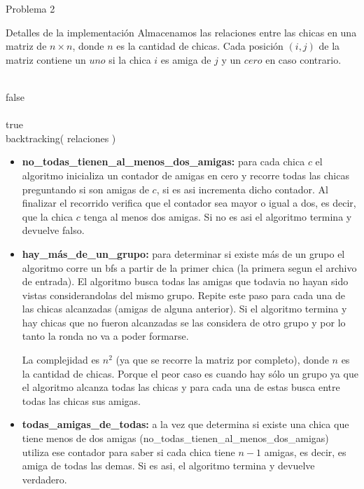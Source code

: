 \begin{section}{Problema 2}
\begin{subsection}{Detalles de la implementación}
		Almacenamos las relaciones entre las chicas en una matriz de $n \times n$, donde $n$ es la cantidad de chicas. Cada posición $(i,j)$ de la matriz contiene un $uno$ si la chica $i$ es amiga de $j$ y un $cero$ en caso contrario.\VSP

		\begin{pseudo}
			\tab{} \\
			\tab\tab \RET false \\
			\tab{} \\
			\tab\tab \RET true \\
			\tab backtracking( relaciones )
		\end{pseudo}

		\begin{itemize}
			\item \textbf{no\_todas\_tienen\_al\_menos\_dos\_amigas:} para cada chica $c$ el algoritmo inicializa un contador de amigas en cero y recorre todas las chicas preguntando si son amigas de $c$, si es asi incrementa dicho contador. Al finalizar el recorrido verifica que el contador sea mayor o igual a dos, es decir, que la chica $c$ tenga al menos dos amigas. Si no es asi el algoritmo termina y devuelve falso.

			\item \textbf{hay\_más\_de\_un\_grupo:} para determinar si existe más de un grupo el algoritmo corre un bfs a partir de la primer chica (la primera segun el archivo de entrada). El algoritmo busca todas las amigas que todavia no hayan sido vistas considerandolas del mismo grupo. Repite este paso para cada una de las chicas alcanzadas (amigas de alguna anterior). Si el algoritmo termina y hay chicas que no fueron alcanzadas se las considera de otro grupo y por lo tanto la ronda no va a poder formarse.

La complejidad es $n^2$ (ya que se recorre la matriz por completo), donde $n$ es la cantidad de chicas. Porque el peor caso es cuando hay sólo un grupo ya que el algoritmo alcanza todas las chicas y para cada una de estas busca entre todas las chicas sus amigas.

		\item \textbf{todas\_amigas\_de\_todas:} a la vez que determina si existe una chica que tiene menos de dos amigas (no\_todas\_tienen\_al\_menos\_dos\_amigas) utiliza ese contador para saber si cada chica tiene $n-1$ amigas, es decir, es amiga de todas las demas. Si es asi, el algoritmo termina y devuelve verdadero.


\end{itemize}
\end{subsection}
\end{section}
